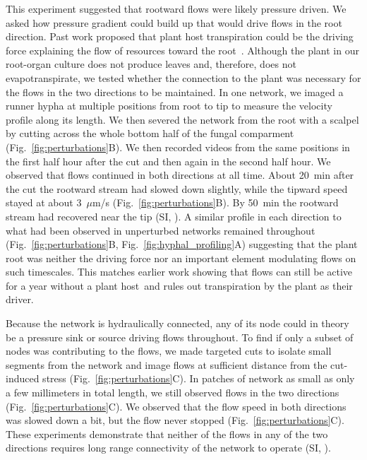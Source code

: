 This experiment suggested that rootward flows were likely pressure driven. We asked how pressure gradient could build up that would drive flows in the root direction. Past work proposed that plant host transpiration could be the driving force explaining the flow of resources toward the root~\cite{kikuchi_aquaporin-mediated_2016}.
Although the plant in our root-organ culture does not produce leaves and, therefore, does not evapotranspirate, we tested whether the connection to the plant was necessary for the flows in the two directions to be maintained.
In one network, we imaged a runner hypha at multiple positions from root to tip to measure the velocity profile along its length.
We then severed the network from the root with a scalpel by cutting across the whole bottom half of the fungal comparment (Fig.~\ref{fig:perturbations}B). We then recorded videos from the same positions in the first half hour after the cut and then again in the second half hour.
We observed that flows continued in both directions at all time.
About 20~min after the cut the rootward stream had slowed down slightly, while the tipward speed stayed at about 3~$\mu$m/s (Fig.~\ref{fig:perturbations}B).
By 50~min the rootward stream had recovered near the tip (SI, ). A similar profile in each direction to what had been observed in unperturbed networks remained throughout (Fig.~\ref{fig:perturbations}B, Fig.~\ref{fig:hyphal_profiling}A) suggesting that the plant root was neither the driving force nor an important element modulating flows on such timescales.
This matches earlier work showing that flows can still be active for a year without a plant host~\cite{kleinCytoplasmicFlowDynamics2026}and rules out transpiration by the plant as their driver.

Because the network is hydraulically connected, any of its node could in theory be a pressure sink or source driving flows throughout. To find if only a subset of nodes was contributing to the flows, we made targeted cuts to isolate small segments from the network and image flows at sufficient distance from the cut-induced stress (Fig.~\ref{fig:perturbations}C).
In patches of network as small as only a few millimeters in total length, we still observed flows in the two directions (Fig.~\ref{fig:perturbations}C).
We observed that the flow speed in both directions was slowed down a bit, but the flow never stopped (Fig.~\ref{fig:perturbations}C).
These experiments demonstrate that neither of the flows in any of the two directions requires long range connectivity of the network to operate (SI, ). 

